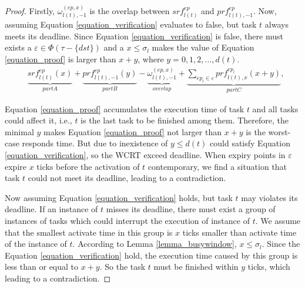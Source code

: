 \documentclass[sigconf]{acmart}
\begin{document}
\begin{proof}
	
  Firstly, $\omega_{l(t),-1}^{(ep,x)}$ is the overlap between $srf^{ep}_{l(t)}$ and $prf^{ep}_{l(t),-1}$. Now, assuming Equation \ref{equation_verification} evaluates to false, but task $t$ always meets its deadline. Since Equation \ref{equation_verification} is false, there must exists a $\varepsilon\in\Phi(\tau-\{dst\})$ and a $x\leq \sigma_l$ makes the value of Equation \ref{equation_proof} is larger than $x+y$, where $y=0,1,2,\dots,d(t)$.
  \begin{equation}\begin{split}
      &\underbrace{srf^{ep}_{l(t)}(x)}_{part A}+\underbrace{prf^{ep}_{l(t),-1}(y)}_{part B}-\underbrace{\omega^{(ep,x)}_{l(t),-1}}_{overlap}+\underbrace{\sum\limits_{ep_i\in \varepsilon}prf^{ep_i}_{l(t),x}(x+y)}_{part C},
    \end{split}\label{equation_proof}\end{equation}
  
  Equation \ref{equation_proof} accumulates the execution time of task $t$ and all tasks could affect it, i.e., $t$ is the last task to be finished among them. Therefore, the minimal $y$ makes Equation \ref{equation_proof} not larger than $x+y$ is the worst-case responds time. But due to inexistence of $y\leq d(t)$ could satisfy Equation \ref{equation_verification}, so the WCRT exceed deadline. When expiry points in $\varepsilon$ expire $x$ ticks before the activation of $t$ contemporary, we find a situation that task $t$ could not meet its deadline, leading to a contradiction. 
  
  Now assuming Equation \ref{equation_verification} holds, but task $t$ may violates its deadline. If an instance of $t$ misses its deadline, there must exist a group of instances of tasks which could interrupt the execution of instance of $t$. We assume that the smallest activate time in this group is $x$ ticks smaller than activate time of the instance of $t$. According to Lemma \ref{lemma_busywindow}, $x\leq \sigma_l$. Since the Equation \ref{equation_verification} hold, the execution time caused by this group is less than or equal to $x+y$. So the task $t$ must be finished within $y$ ticks, which leading to a contradiction.
\end{proof}

\end{document}
